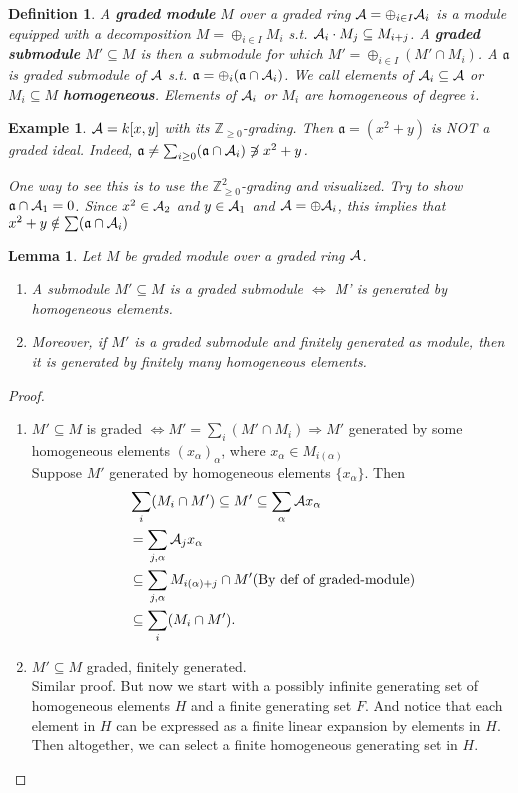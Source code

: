 \documentclass[11pt]{article}
\newtheorem{lemma}[thm]{Lemma}
\newtheorem{dfn}[thm]{Definition}
\newtheorem{ex}[thm]{Example}
\newcommand{\intg}{\mathbb Z}
\newcommand{\sca}{{\mathfrak a}}
\newcommand{\cala}{{\cal A}}
\newcommand{\Lrta}{\Longrightarrow}
\newcommand{\Llrta}{\Longleftrightarrow}
\begin{document}
\begin{dfn}
A \textbf{graded module} $M$ over a graded ring $\cala=\oplus_{i\in I}\cala_i$ is a module equipped with a decomposition $M=\oplus_{i\in I } M_i$
 s.t. $\cala_i\cdot M_j\subseteq M_{i+j}$. A \textbf{graded submodule } $M'\subseteq M$ is then a submodule for which $M'=\oplus_{i\in I}(M'\cap M_i)$. A  $\sca$ is  graded submodule of $\cala$ s.t. $\sca=\oplus_i(\sca\cap \cala_i)$.
We call elements of $\cala_i\subseteq \cala$ or $ M_i\subseteq M$ \textbf{homogeneous}. Elements of $\cala_i$ or $M_i$ are homogeneous of degree $i$.
\end{dfn}

\begin{ex}
$\cala=k[x,y]$ with its $\intg_{\geq 0}$-grading. Then $\sca=(x^2+y)$ is NOT a graded ideal. Indeed, $\sca\neq \sum_{i\geq 0}(\sca\cap \cala_i)\not\ni x^2+y$.

One way to see this is to use the $\intg^2_{\geq 0}$-grading and visualized. Try to show $\sca\cap \cala_1={0}$. Since $x^2\in\cala_2$ and $y\in\cala_1$ and $\cala=\oplus\cala_i$, this implies that $x^2+y\notin \sum(\sca\cap\cala_i)$
\end{ex}

\begin{lemma}
Let $M$ be graded module over a graded ring $\cala$. 
\begin{enumerate}[label=(\roman*)]
\item A submodule $M'\subseteq M$ is a graded submodule $\Llrta$ M' is generated by homogeneous elements. 
\item Moreover, if $M'$ is a graded submodule and finitely generated as module, then it is generated by finitely many homogeneous elements.
\end{enumerate}
\end{lemma}
\begin{proof}
\begin{enumerate}[label=(\roman*)]
\item $M'\subseteq M$ is graded $\Llrta M'=\sum_i(M'\cap M_i)\Lrta M'$ generated by some homogeneous elements $(x_\alpha)_\alpha$, where $x_\alpha\in M_{i(\alpha)}$\\
Suppose $M'$ generated by homogeneous elements $\{x_\alpha\}$. Then
$$
\begin{aligned}
&\sum_i(M_i\cap M')\subseteq M'\subseteq \sum_\alpha\cala x_\alpha\\
&=\sum_{j,\alpha}\cala_j x_\alpha\\
&\subseteq\sum_{j,\alpha} M_{i(\alpha)+j}\cap M'(\text{By def of graded-module})\\
&\subseteq \sum_i (M_i\cap M').
\end{aligned}
$$
\item $M'\subseteq M$ graded, finitely generated.\\
Similar proof. But now we start with a possibly infinite generating set of homogeneous elements $H$ and a finite generating set $F$. And notice that each element in $H$ can be expressed as a finite linear expansion by elements in $H$. Then altogether, we can select a finite homogeneous generating set in $H$. 
\end{enumerate}
\end{proof}
\end{document}
